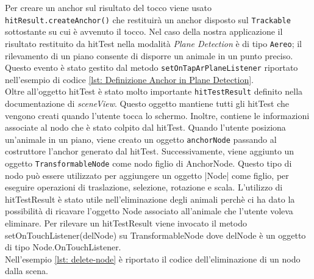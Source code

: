 \documentclass[crop=false, class=book]{standalone}
\begin{document}
	\noindent
	
	Per creare un anchor sul risultato del tocco viene usato \verb|hitResult.createAnchor()| che restituirà un anchor disposto 		sul \verb|Trackable| sottostante su cui è avvenuto il tocco.
	Nel caso della nostra applicazione il risultato restituito da hitTest nella modalità \emph{Plane Detection} è di tipo 			\verb|Aereo|; il rilevamento di un piano consente di disporre un animale in un punto preciso. Questo evento è stato gestito 	dal metodo \verb|setOnTapArPlaneListener| riportato nell'esempio di codice \vref{lst: Definizione Anchor in Plane 				Detection}.\\
	Oltre all'oggetto hitTest è stato molto importante \verb|hitTestResult| definito nella documentazione di 						\emph{sceneView}. Questo oggetto mantiene tutti gli hitTest che vengono creati quando l'utente tocca lo schermo. 				Inoltre, contiene le informazioni associate al nodo che è stato colpito dal hitTest. Quando l'utente posiziona un'animale 		in 	un piano, viene creato un oggetto \verb|anchorNode| passando al costruttore l'anchor generato dal 							hitTest. Successivamente, viene aggiunto un oggetto \verb|TransformableNode| come nodo figlio di AnchorNode. Questo 			tipo di nodo può essere utilizzato per aggiungere un oggetto \verbe|Node| come figlio, per eseguire operazioni di 				traslazione, selezione, rotazione e scala. L'utilizzo di hitTestResult è stato utile nell'eliminazione degli animali perchè 	ci ha dato la possibilità di ricavare l'oggetto Node associato all'animale che l'utente voleva eliminare. Per rilevare un 		hitTestResult viene invocato il metodo setOnTouchListener(delNode) su TransformableNode dove delNode è un oggetto di tipo 		Node.OnTouchListener.\\	Nell'esempio \vref{lst: delete-node} è riportato il codice dell'eliminazione di un nodo dalla 			scena.
	
\end{document}
